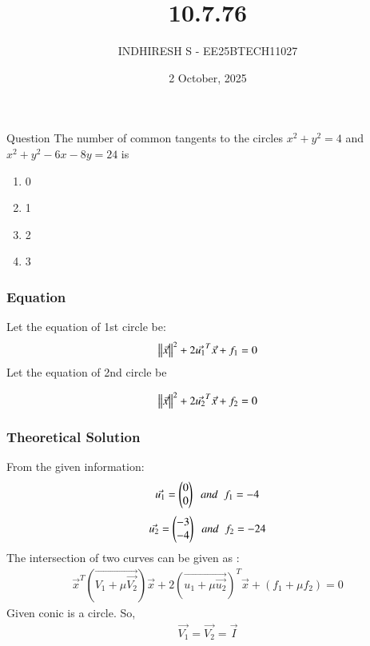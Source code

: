 \documentclass{beamer}
\title %
    {10.7.76}
\date{2 October, 2025}
\author %
    {INDHIRESH S - EE25BTECH11027}
\begin{document}
    
    \frame{\titlepage}
    
    \begin{frame}{Question}
   The number of common tangents to the circles $x^2 +y^2 = 4$ and $x^2 +y^2 -6x-8y = 24$ is
\begin{enumerate}
    \item 0
    \item 1
    \item 2
    \item 3
\end{enumerate}
    \end{frame}
    
    \begin{frame}[allowframebreaks] 
    \frametitle{Equation}
        \centering
        \label{tab:parameters}
  Let the equation of 1st circle be:
\begin{align}
 \left\lVert\Vec{x}\right\rVert^2+2\Vec{u_1}^T\Vec{x}+f_1=0
\end{align}
Let the equation of 2nd circle be 

\begin{align}
  \left\lVert\Vec{x}\right\rVert^2+2\Vec{u_2}^T\Vec{x}+f_2=0
\end{align}

    \end{frame}
    
    \begin{frame}
    \frametitle{Theoretical Solution}
   From the given information:
\begin{align}
\Vec{u_1}=\begin{pmatrix}0\\0\end{pmatrix}\;\;and\;\;f_1=-4
\end{align}
\begin{align}
\Vec{u_2}=\begin{pmatrix}-3\\-4\end{pmatrix}\;\;and\;\;f_2=-24
\end{align}
The intersection of two curves can be given as :
\begin{align}
\Vec{x}^T(\Vec{V_1+\mu\Vec{V_2}})\Vec{x}+2(\Vec{u_1+\mu\Vec{u_2}})^T\Vec{x}+(f_1+\mu f_2)=0
\end{align}
Given conic is a circle. So,
\begin{align}
    \Vec{V_1}=\Vec{V_2}=\Vec{I}
\end{align}

    \end{frame}
    
\end{document}
